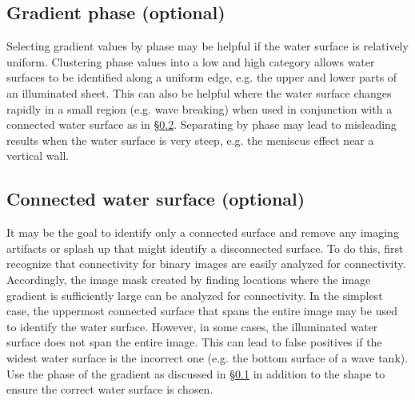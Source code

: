 \subsection{Gradient phase (optional)} \label{sec:phasing}
\par
Selecting gradient values by phase may be helpful if the water surface is relatively uniform.
Clustering phase values into a low and high category allows water surfaces to be identified along a uniform edge, e.g. the upper and lower parts of an illuminated sheet.
This can also be helpful where the water surface changes rapidly in a small region (e.g. wave breaking) when used in conjunction with a connected water surface as in \S \ref{sec:isolation}.
Separating by phase may lead to misleading results when the water surface is very steep, e.g. the meniscus effect near a vertical wall.

\subsection{Connected water surface (optional)} \label{sec:isolation}
\par
It may be the goal to identify only a connected surface and remove any imaging artifacts or splash up that might identify a disconnected surface.
To do this, first recognize that connectivity for binary images are easily analyzed for connectivity.
Accordingly, the image mask created by finding locations where the image gradient is sufficiently large can be analyzed for connectivity.
In the simplest case, the uppermost connected surface that spans the entire image may be used to identify the water surface.
However, in some cases, the illuminated water surface does not span the entire image.
This can lead to false positives if the widest water surface is the incorrect one (e.g. the bottom surface of a wave tank).
Use the phase of the gradient as discussed in \S \ref{sec:phasing} in addition to the shape to ensure the correct water surface is chosen.
%
